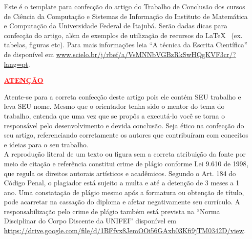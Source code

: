 Este é o template para confecção do artigo do Trabalho de Conclusão dos cursos de Ciência da Computação e Sistemas de Informação do Instituto de Matemática e Computação da Universidade Federal de Itajubá. Serão dadas dicas para confecção do artigo, além de exemplos de utilização de recursos do \LaTeX~ (ex. tabelas, figuras etc). Para mais informações leia ``A técnica da Escrita Científica'' de \cite{oliveira2015} disponível em \url{www.scielo.br/j/rbef/a/VsMNNbVGBzRkSwHQgKVF3cr/?lang=pt}.

\begin{center}
    \textcolor{red}{\LARGE\textbf{\underline{ATENÇÃO}}}
\end{center} 

Atente-se para a correta confecção deste artigo pois ele contém SEU trabalho e leva SEU nome. Mesmo que o orientador tenha sido o mentor do tema do trabalho, entenda que uma vez que se propôs a executá-lo você se torna o responsável pelo desenvolvimento e devida conclusão. Seja ético na confecção do seu artigo, referenciando corretamente os autores que contribuíram com conceitos e ideias para o seu trabalho. \\

A reprodução literal de um texto ou figura sem a correta atribuição da fonte por meio de citação e referência constitui crime de plágio conforme Lei 9.610 de 1998, que regula os direitos autorais artísticos e acadêmicos. Segundo o Art. 184 do Código Penal, o plagiador está sujeito a multa e até a detenção de 3 meses a 1 ano. Uma constatação de plágio mesmo após a formatura ou obtenção de título, pode acarretar na cassação do diploma e afetar negativamente seu currículo. A responsabilização pelo crime de plágio também está prevista na ``Norma Disciplinar do Corpo Discente da UNIFEI'' disponível em \url{https://drive.google.com/file/d/1BFfvx8JemOOi56GAxb03Kfi9jTM0342D/view}.